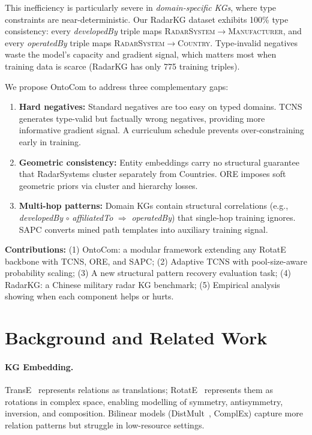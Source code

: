 \documentclass[10pt,twocolumn]{article}
\begin{document}
This inefficiency is particularly severe in \emph{domain-specific KGs}, where
type constraints are near-deterministic. Our RadarKG dataset exhibits 100\% type
consistency: every \textit{developedBy} triple maps
\textsc{RadarSystem}$\to$\textsc{Manufacturer}, and every \textit{operatedBy}
triple maps \textsc{RadarSystem}$\to$\textsc{Country}. Type-invalid negatives
waste the model's capacity and gradient signal, which matters most when training
data is scarce (RadarKG has only 775 training triples).

We propose OntoCom to address three complementary gaps:

\begin{enumerate}
  \item \textbf{Hard negatives:} Standard negatives are too easy on typed domains.
  TCNS generates type-valid but factually wrong negatives, providing more informative
  gradient signal. A curriculum schedule prevents over-constraining early in training.

  \item \textbf{Geometric consistency:} Entity embeddings carry no structural
  guarantee that RadarSystems cluster separately from Countries. ORE imposes
  soft geometric priors via cluster and hierarchy losses.

  \item \textbf{Multi-hop patterns:} Domain KGs contain structural correlations
  (e.g., \textit{developedBy} $\circ$ \textit{affiliatedTo} $\Rightarrow$ \textit{operatedBy})
  that single-hop training ignores. SAPC converts mined path templates into
  auxiliary training signal.
\end{enumerate}

\noindent\textbf{Contributions:}
(1) OntoCom: a modular framework extending any RotatE backbone with TCNS, ORE,
and SAPC;
(2) Adaptive TCNS with pool-size-aware probability scaling;
(3) A new structural pattern recovery evaluation task;
(4) RadarKG: a Chinese military radar KG benchmark;
(5) Empirical analysis showing when each component helps or hurts.

\section{Background and Related Work}

\paragraph{KG Embedding.}
TransE~\cite{bordes2013translating} represents relations as translations;
RotatE~\cite{sun2019rotate} represents them as rotations in complex space, enabling
modelling of symmetry, antisymmetry, inversion, and composition.
Bilinear models (DistMult~\cite{yang2014embedding}, ComplEx) capture more relation
patterns but struggle in low-resource settings.
\end{document}
